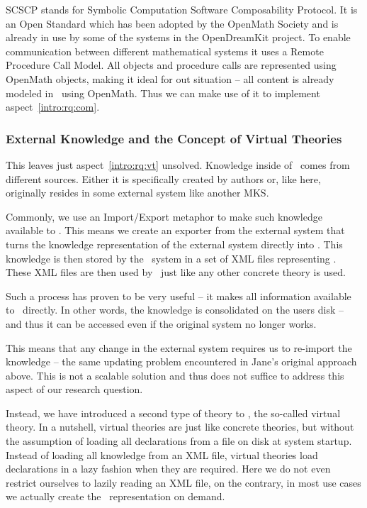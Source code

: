 SCSCP \cite{SCSCP} stands for Symbolic Computation Software Composability Protocol. 
It is an Open Standard which has been adopted by the OpenMath Society and is already in use by some of the systems in the OpenDreamKit project. 
To enable communication between different mathematical systems it uses a Remote Procedure Call Model. 
All objects and procedure calls are represented using OpenMath objects, making it ideal for out situation -- all content is already modeled in \omdocmmt\ using OpenMath. 
Thus we can make use of it to implement aspect~\ref{intro:rq:com}. 

\subsubsection*{External Knowledge and the Concept of Virtual Theories}\label{sec:intro:external}

This leaves just aspect~\ref{intro:rq:vt} unsolved. 
Knowledge inside of \mmt\ comes from different sources. 
Either it is specifically created by authors or, like here, originally resides in some external system like another MKS. 

Commonly, we use an Import/Export metaphor to make such knowledge available to \mmt. 
This means we create an exporter from the external system that turns the knowledge representation of the external system directly into \omdocmmt. 
This knowledge is then stored by the \mmt\ system in a set of XML files representing \omdocmmt. 
These XML files are then used by \mmt\ just like any other concrete theory is used. 

Such a process has proven to be very useful -- it makes all information available to \mmt\ directly. 
In other words, the knowledge is consolidated on the users disk -- and thus it can be accessed even if the original system no longer works. 

This means that any change in the external system requires us to re-import the knowledge -- the same updating problem encountered in Jane's original approach above. 
This is not a scalable solution and thus does not suffice to address this aspect of our research question. 

Instead, we have introduced a second type of theory to \mmt, the so-called virtual theory. 
In a nutshell, virtual theories are just like concrete theories, but without the assumption of loading all declarations from a file on disk at system startup. 
Instead of loading all knowledge from an XML file, virtual theories load declarations in a lazy fashion when they are required. 
Here we do not even restrict ourselves to lazily reading an XML file, on the contrary, in most use cases we actually create the \omdocmmt\ representation on demand. 


